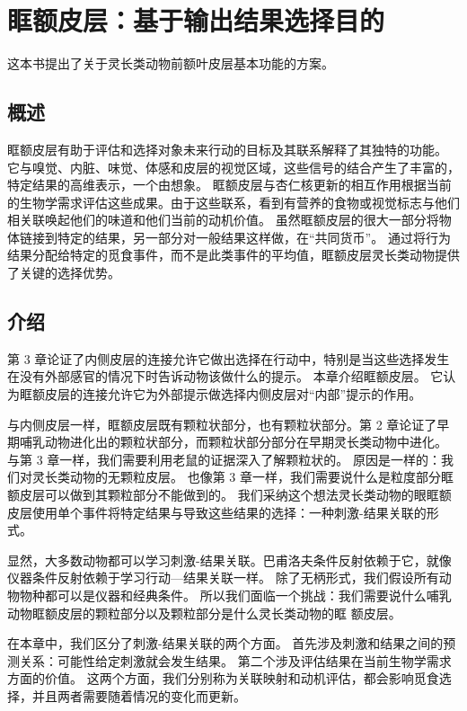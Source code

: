 \chapter{眶额皮层：基于输出结果选择目的}
这本书提出了关于灵长类动物前额叶皮层基本功能的方案。

\section{概述}
眶额皮层有助于评估和选择对象未来行动的目标及其联系解释了其独特的功能。 它与嗅觉、内脏、味觉、体感和皮层的视觉区域，这些信号的结合产生了丰富的，特定结果的高维表示，一个由想象。 眶额皮层与杏仁核更新的相互作用根据当前的生物学需求评估这些成果。由于这些联系，看到有营养的食物或视觉标志与他们相关联唤起他们的味道和他们当前的动机价值。 虽然眶额皮层的很大一部分将物体链接到特定的结果，另一部分对一般结果这样做，在“共同货币”。 通过将行为结果分配给特定的觅食事件，而不是此类事件的平均值，眶额皮层灵长类动物提供了关键的选择优势。
\section{介绍}
第 3 章论证了内侧皮层的连接允许它做出选择在行动中，特别是当这些选择发生在没有外部感官的情况下时告诉动物该做什么的提示。 本章介绍眶额皮层。 它认为眶额皮层的连接允许它为外部提示做选择内侧皮层对“内部”提示的作用。\par
与内侧皮层一样，眶额皮层既有颗粒状部分，也有颗粒状部分。第 2 章论证了早期哺乳动物进化出的颗粒状部分，而颗粒状部分部分在早期灵长类动物中进化。 与第 3 章一样，我们需要利用老鼠的证据深入了解颗粒状的。 原因是一样的：我们对灵长类动物的无颗粒皮层。 也像第 3 章一样，我们需要说什么是粒度部分眶额皮层可以做到其颗粒部分不能做到的。 我们采纳这个想法灵长类动物的眼眶额皮层使用单个事件将特定结果与导致这些结果的选择：一种刺激-结果关联的形式。\par
显然，大多数动物都可以学习刺激-结果关联。巴甫洛夫条件反射依赖于它，就像仪器条件反射依赖于学习行动—结果关联一样。 除了无柄形式，我们假设所有动物物种都可以是仪器和经典条件。 所以我们面临一个挑战：我们需要说什么哺乳动物眶额皮层的颗粒部分以及颗粒部分是什么灵长类动物的眶 额皮层。\par
在本章中，我们区分了刺激-结果关联的两个方面。 首先涉及刺激和结果之间的预测关系：可能性给定刺激就会发生结果。 第二个涉及评估结果在当前生物学需求方面的价值。 这两个方面，我们分别称为关联映射和动机评估，都会影响觅食选择，并且两者需要随着情况的变化而更新。\par
